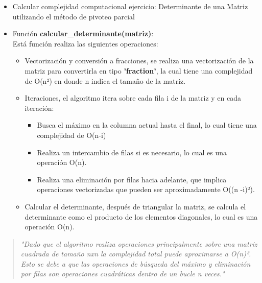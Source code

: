 \documentclass[11pt]{article}
\providecommand{\tightlist}{%
      \setlength{\itemsep}{0pt}\setlength{\parskip}{0pt}}
\begin{document}
    \begin{itemize}
\item
  Calcular complejidad computacional ejercicio: Determinante de una
  Matriz utilizando el método de pivoteo parcial
\item
  Función \textbf{calcular\_determinante(matriz)}:\\
  Está función realiza las siguientes operaciones:

  \begin{itemize}
  \tightlist
  \item
    Vectorización y conversión a fracciones, se realiza una
    vectorización de la matriz para convertirla en tipo
    \textbf{'fraction'}, la cual tiene una complejidad de O(n²) en donde
    n indica el tamaño de la matriz.
  \item
    Iteraciones, el algoritmo itera sobre cada fila i de la matriz y en
    cada iteración:

    \begin{itemize}
    \tightlist
    \item
      Busca el máximo en la columna actual hasta el final, lo cual tiene
      una complejidad de O(n-i)
    \item
      Realiza un intercambio de filas si es necesario, lo cual es una
      operación O(n).
    \item
      Realiza una eliminación por filas hacia adelante, que implica
      operaciones vectorizadas que pueden ser aproximadamente O((n
      -i)²).
    \end{itemize}
  \item
    Calcular el determinante, después de triangular la matriz, se
    calcula el determinante como el producto de los elementos
    diagonales, lo cual es una operación O(n).
  \end{itemize}
\end{itemize}

\begin{quote}
\emph{"Dado que el algoritmo realiza operaciones principalmente sobre
una matriz cuadrada de tamaño nxn la complejidad total puede aproximarse
a O(n)³. Esto se debe a que las operaciones de búsqueda del máximo y
eliminación por filas son operaciones cuadráticas dentro de un bucle n
veces."}
\end{quote}
\end{document}
